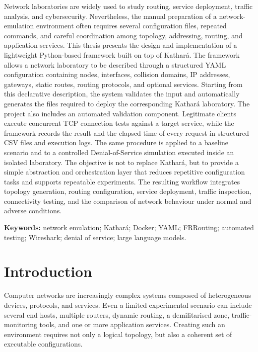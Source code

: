 \documentclass[a4paper,10pt,titlepage,twoside]{book}
\numberwithin{equation}{chapter}
\theoremstyle{plain}
\theoremstyle{definition}
\begin{document}
Network laboratories are widely used to study routing, service deployment,
traffic analysis, and cybersecurity. Nevertheless, the manual preparation of
a network-emulation environment often requires several configuration files,
repeated commands, and careful coordination among topology, addressing,
routing, and application services. This thesis presents the design and
implementation of a lightweight Python-based framework built on top of
Kathar\'a. The framework allows a network laboratory to be described through a
structured YAML configuration containing nodes, interfaces, collision domains,
IP addresses, gateways, static routes, routing protocols, and optional
services. Starting from this declarative description, the system validates the
input and automatically generates the files required to deploy the
corresponding Kathar\'a laboratory. The project also includes an automated
validation component. Legitimate clients execute concurrent TCP connection
tests against a target service, while the framework records the result and the
elapsed time of every request in structured CSV files and execution logs. The
same procedure is applied to a baseline scenario and to a controlled
Denial-of-Service simulation executed inside an isolated laboratory. The
objective is not to replace Kathar\'a, but to provide a simple abstraction and
orchestration layer that reduces repetitive configuration tasks and supports
repeatable experiments. The resulting workflow integrates topology generation,
routing configuration, service deployment, traffic inspection, connectivity
testing, and the comparison of network behaviour under normal and adverse
conditions.

\bigskip
\noindent\textbf{Keywords:}
network emulation; Kathar\'a; Docker; YAML; FRRouting; automated testing;
Wireshark; denial of service; large language models.

\tableofcontents

\chapter*{Introduction}
{}
\label{chap:introduction}

Computer networks are increasingly complex systems composed of heterogeneous
devices, protocols, and services. Even a limited experimental scenario can
include several end hosts, multiple routers, dynamic routing, a demilitarised
zone, traffic-monitoring tools, and one or more application services. Creating
such an environment requires not only a logical topology, but also a coherent
set of executable configurations.
\end{document}
